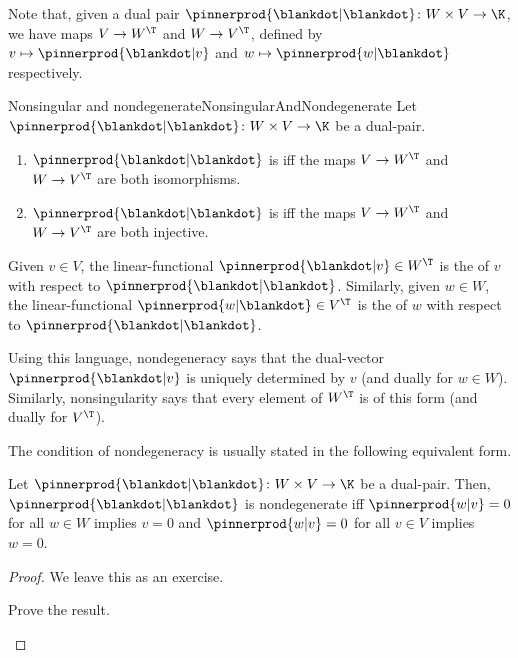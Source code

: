 Note that, given a dual pair $\pinnerprod{\blankdot |\blankdot}\colon W\times V\rightarrow \K$, we have maps $V\rightarrow W^{\T}$ and $W\rightarrow V^{\T}$, defined by $v\mapsto \pinnerprod{\blankdot |v}$ and $w\mapsto \pinnerprod{w|\blankdot}$ respectively.
\begin{dfn}{Nonsingular and nondegenerate\hfill}{NonsingularAndNondegenerate}
	Let $\pinnerprod{\blankdot |\blankdot}\colon W\times V\rightarrow \K$ be a dual-pair.
	\begin{enumerate}
		\item $\pinnerprod{\blankdot |\blankdot}$ is  iff the maps $V\rightarrow W^{\T}$ and $W\rightarrow V^{\T}$ are both isomorphisms.
		\item $\pinnerprod{\blankdot |\blankdot}$ is  iff the maps $V\rightarrow W^{\T}$ and $W\rightarrow V^{\T}$ are both injective.
	\end{enumerate}
	\begin{rmk}
		Given $v\in V$, the linear-functional $\pinnerprod{\blankdot |v}\in W^{\T}$ is the  of $v$ with respect to $\pinnerprod{\blankdot |\blankdot}$.  Similarly, given $w\in W$, the linear-functional $\pinnerprod{w|\blankdot}\in V^{\T}$ is the  of $w$ with respect to $\pinnerprod{\blankdot |\blankdot}$.
		
		Using this language, nondegeneracy says that the dual-vector $\pinnerprod{\blankdot |v}$ is uniquely determined by $v$ (and dually for $w\in W$).  Similarly, nonsingularity says that every element of $W^{\T}$ is of this form (and dually for $V^{\T}$).
	\end{rmk}
\end{dfn}
The condition of nondegeneracy is usually stated in the following equivalent form.
\begin{prp}{}{}
	Let $\pinnerprod{\blankdot |\blankdot}\colon W\times V\rightarrow \K$ be a dual-pair.  Then, $\pinnerprod{\blankdot |\blankdot}$ is nondegenerate iff $\pinnerprod{w|v}=0$ for all $w\in W$ implies $v=0$ and $\pinnerprod{w|v}=0$ for all $v\in V$ implies $w=0$.
	\begin{proof}
		We leave this as an exercise.
		\begin{exr}[breakable=false]{}{}
			Prove the result.
		\end{exr}
	\end{proof}
\end{prp}
